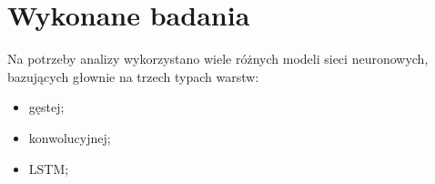 \newpage %
\section{Wykonane badania}







Na potrzeby analizy wykorzystano wiele różnych modeli sieci neuronowych, bazujących głownie na trzech typach warstw:

\begin{itemize}
    \item gęstej;
    \item konwolucyjnej;
    \item LSTM;
\end{itemize}

